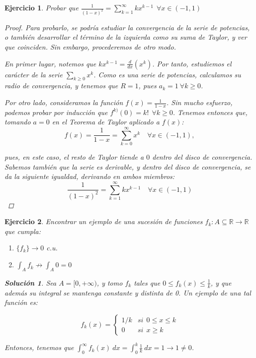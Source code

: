 \documentclass[11pt, a4paper]{article}
\theoremstyle{theorem-style}
\theoremstyle{definition-style}
\newtheorem{ejer}{Ejercicio}[section]
\theoremstyle{remark-style}
\newtheorem*{sol}{Solución}
\theoremstyle{example-style}
\newenvironment{nlist}
{\begin{enumerate}
    \renewcommand\labelenumi{(\emph{\roman{enumi})}}}
  {\end{enumerate}}
\begin{document}
\begin{ejer}
  Probar que $\displaystyle \frac{1}{(1-x)^2} = \sum_{k=1}^\infty kx^{k-1}\ \ \forall x \in (-1,1)$
  
  \begin{proof}
    Para probarlo, se podría estudiar la convergencia de la serie de potencias, o también desarrollar el término de la izquierda como su suma de Taylor, y ver que coinciden. Sin embargo, procederemos de otro modo.
    
    En primer lugar, notemos que $\displaystyle kx^{k-1} = \frac{d}{dx}(x^k)$. Por tanto, estudiemos el carácter de la serie $\displaystyle \sum_{k\ge0} x^k$. Como es una serie de potencias, calculamos su radio de convergencia, y tenemos que $R = 1$, pues $a_k=1 \ \forall k \ge 0$.
    
    Por otro lado, consideramos la función $\displaystyle f(x) = \frac{1}{1-x}$. Sin mucho esfuerzo, podemos probar por inducción que $f^{k)}(0) = k! \ \ \forall k \ge 0$. Tenemos entonces que, tomando $a=0$ en el \textit{Teorema de Taylor} aplicado a $f(x)$: $$f(x) = \frac{1}{1-x} = \sum_{k=0}^\infty x^k \quad \forall x \in (-1,1),$$
    
    pues, en este caso, el resto de Taylor tiende a $0$ dentro del disco de convergencia. Sabemos también que la serie es derivable, y dentro del disco de convergencia, se da la siguiente igualdad, derivando en ambos miembros: $$\frac{1}{(1-x)^2} = \sum_{k=1}^\infty kx^{k-1}\quad \forall x \in (-1,1)$$
  \end{proof}
\end{ejer}

\begin{ejer}
  Encontrar un ejemplo de una sucesión de funciones $f_k: A \subseteq \mathbb{R} \to \mathbb{R}$ que cumpla:
  \begin{nlist}
  \item $\{f_k\} \to 0$ c.u.
  \item $\displaystyle \int_A f_k \not \to \int_A 0 = 0$
  \end{nlist}

  \begin{sol}
    Sea $A = [0,+\infty)$, y tomo $f_k$ tales que $0 \le f_k(x) \le \frac{1}{k}$, y que además su integral se mantenga constante y distinta de 0. Un ejemplo de una tal función es:

    $$f_k(x) = 
    \begin{cases}
      1/k & si \ \ 0 \le x \le k \\
      0 & si \ \ x \ge k
    \end{cases}$$

    Entonces, tenemos que $\displaystyle \int_0^\infty f_k(x)\ dx = \int_0^k \frac{1}{k}\ dx = 1 \to 1 \ne 0 $.
  \end{sol}
\end{ejer}
\end{document}
